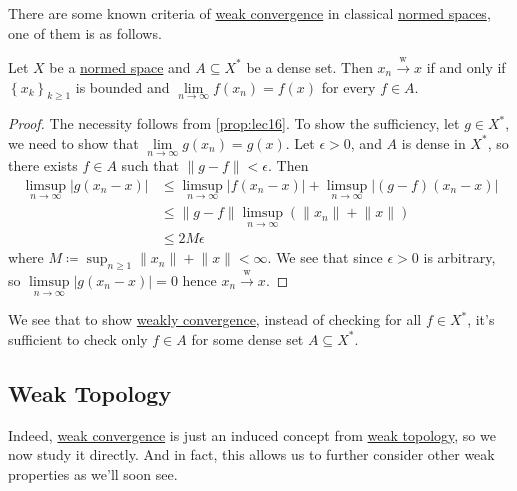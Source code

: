 There are some known criteria of \hyperref[def:weakly-convergence]{weak convergence} in classical \hyperref[def:normed-vector-space]{normed spaces}, one of them is as follows.
\begin{lemma}\label{lma:testing-weak-convergence-on-a-dense-set}
	Let \(X\) be a \hyperref[def:normed-vector-space]{normed space} and \(A \subseteq X^{\ast} \) be a dense set. Then \(x_n \overset{\text{w}}{\to } x\) if and only if \(\left\{ x_k \right\} _{k\geq 1}\) is bounded and \(\lim\limits_{n \to \infty} f(x_n) = f(x)\) for every \(f\in A\).
\end{lemma}
\begin{proof}
	The necessity follows from \autoref{prop:lec16}. To show the sufficiency, let \(g\in X^{\ast} \), we need to show that \(\lim\limits_{n \to \infty} g(x_n) = g(x)\). Let \(\epsilon > 0\), and \(A\) is dense in \(X^{\ast} \), so there exists \(f\in A\) such that \(\left\lVert g-f\right\rVert < \epsilon \). Then
	\[
		\begin{split}
			\limsup_{n \to \infty} \left\vert g(x_n - x) \right\vert
			&\leq \limsup_{n \to \infty} \left\vert f(x_n - x) \right\vert + \limsup_{n \to \infty} \left\vert (g-f)(x_{n} -x ) \right\vert \\
			&\leq \left\lVert g-f\right\rVert \limsup_{n \to \infty} (\lVert x_n  \rVert + \lVert x \rVert) \\
			&\leq 2M\epsilon
		\end{split}
	\]
	where \(M\coloneqq \sup _{n\geq 1} \lVert x_n\rVert + \lVert x \rVert < \infty\). We see that since \(\epsilon > 0\) is arbitrary, so \(\limsup\limits_{n \to \infty} \left\vert g(x_{n} - x ) \right\vert = 0\) hence \(x_n \overset{\text{w}}{\to} x\).
\end{proof}

\begin{note}
	We see that to show \hyperref[def:weakly-convergence]{weakly convergence}, instead of checking for all \(f\in X^{\ast} \), it's sufficient to check only \(f\in A\) for some dense set \(A\subseteq X^{\ast} \).
\end{note}

\subsection{Weak Topology}
Indeed, \hyperref[def:weakly-convergence]{weak convergence} is just an induced concept from \hyperref[def:weak-topology]{weak topology}, so we now study it directly. And in fact, this allows us to further consider other weak properties as we'll soon see.

